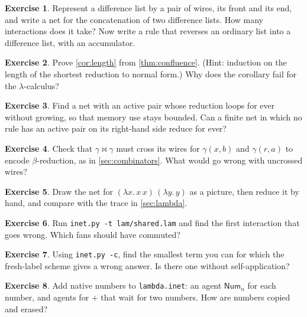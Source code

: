 \documentclass[11pt,a4paper]{article}
\newcommand{\ag}[1]{\mathsf{#1}}
\newcommand{\act}{\mathrel{\bowtie}}
\theoremstyle{definition}
\newtheorem{exercise}{Exercise}
\theoremstyle{plain}
\begin{document}
\begin{exercise}\label{ex:dlist}
Represent a difference list by a pair of wires, its front and its end, and
write a net for the concatenation of two difference lists. How many
interactions does it take? Now write a rule that reverses an ordinary list
into a difference list, with an accumulator.
\end{exercise}

\begin{exercise}
Prove \cref{cor:length} from \cref{thm:confluence}. (Hint: induction on the
length of the shortest reduction to normal form.) Why does the corollary fail
for the $\lambda$-calculus?
\end{exercise}

\begin{exercise}
Find a net with an active pair whose reduction loops for ever without
growing, so that memory use stays bounded. Can a finite net in which no rule
has an active pair on its right-hand side reduce for ever?
\end{exercise}

\begin{exercise}
Check that $\gamma\act\gamma$ must cross its wires for
$\gamma(x,b)$ and $\gamma(r,a)$ to encode $\beta$-reduction, as in
\cref{sec:combinators}. What would go wrong with uncrossed wires?
\end{exercise}

\begin{exercise}
Draw the net for $(\lambda x.\,x\,x)\,(\lambda y.\,y)$ as a picture, then
reduce it by hand, and compare with the trace in \cref{sec:lambda}.
\end{exercise}

\begin{exercise}
Run \texttt{inet.py -t lam/shared.lam} and find the first interaction that
goes wrong. Which fans should have commuted?
\end{exercise}

\begin{exercise}
Using \texttt{inet.py -c}, find the smallest term you can for which the
fresh-label scheme gives a wrong answer. Is there one without
self-application?
\end{exercise}

\begin{exercise}
Add native numbers to \texttt{lambda.inet}: an agent $\ag{Num}_n$ for each
number, and agents for $+$ that wait for two numbers. How are numbers copied
and erased?
\end{exercise}
\end{document}
